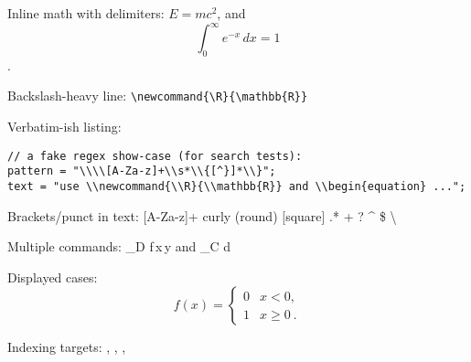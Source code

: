 \documentclass{article}
\begin{document}

Inline math with delimiters: \( E = mc^2 \), and $$\int_0^{\infty} e^{-x}\,dx = 1$$.

Backslash-heavy line:
\texttt{\textbackslash newcommand\{\textbackslash R\}\{\textbackslash mathbb\{R\}\}}

Verbatim-ish listing:
\begin{lstlisting}
// a fake regex show-case (for search tests):
pattern = "\\\\[A-Za-z]+\\s*\\{[^}]*\\}";
text = "use \\newcommand{\\R}{\\mathbb{R}} and \\begin{equation} ...";
\end{lstlisting}

Brackets/punct in text: [A-Za-z]+ {curly} (round) [square] .* + ? ^ \$ \backslash

Multiple commands: \iint_D f\,x\,y and \oint_C \cdot d

Displayed cases:
\[
f(x) = \begin{cases}
  0 & x<0,\\
  1 & x\ge 0~.
\end{cases}
\]

Indexing targets:
\DeclareMathOperator{\sgn}{sgn},
\renewcommand{\epsilon}{\varepsilon},
, 
\end{document}
